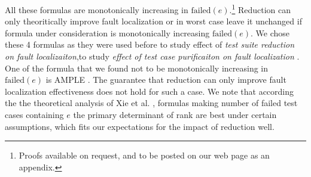 All these formulas are monotonically increasing in
$\text{failed}(e)$.\footnote{Proofs available on request, and to be posted on our web page as an appendix.} Reduction can only theoritically improve fault localization or in worst case leave it unchanged if formula under consideration is monotonically increasing $\text{failed}(e)$. We chose these 4 formulas as they were used before to study effect of \emph{test suite reduction on fault localizaiton},to study \emph{effect of test case purificaiton on fault localization} \cite{EmpirReduce} \cite{PureTest}. One of the formula that we found not to be monotonically increasing in $\text{failed}(e)$ is AMPLE \cite{AMPLE}. The guarantee that reduction can only improve fault localization effectiveness does not hold for such a case. We note that according the the
theoretical analysis of Xie et al. \cite{Theoretical}, formulas making
number of failed test cases containing $e$ the primary
determinant of rank are best under certain assumptions, which fits
our expectations for the impact of reduction well.



